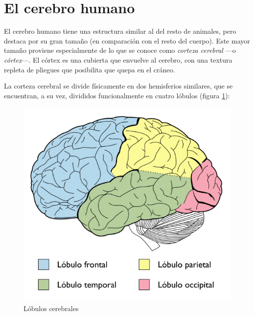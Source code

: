 \section{El cerebro humano}

El cerebro humano tiene una estructura similar al del resto de animales, pero destaca por su gran tamaño (en comparación con el resto del cuerpo). Este mayor tamaño proviene especialmente de lo que se conoce como {\it corteza cerebral} ---o {\it córtex}---. El córtex es una cubierta que envuelve al cerebro, con una textura repleta de pliegues que posibilita que quepa en el cráneo.

La corteza cerebral se divide físicamente en dos hemisferios similares, que se encuentran, a su vez, divididos funcionalmente en cuatro lóbulos (figura \ref{fig::lobulos}):

\begin{figure}[h]
  \begin{center}
    \includegraphics[scale=0.5]{images/lobulos.jpg}
    \caption{Lóbulos cerebrales}
    \label{fig::lobulos}
  \end{center}
\end{figure}

